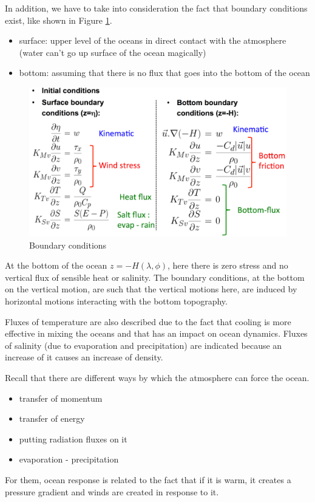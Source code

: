 In addition, we have to take into consideration the fact that boundary conditions exist, like shown in Figure \ref{fig:boundary conditions}.
\begin{itemize}
	\item surface: upper level of the oceans in direct contact with the atmosphere (water can't go up surface of the ocean magically)
	\item bottom: assuming that there is no flux that goes into the bottom of the ocean
\end{itemize}


\begin{figure}[h!]


	\centering
	\includegraphics[width=0.5\linewidth]{uploads/Screenshot 2024-11-21 225410.png}
	\caption{Boundary conditions}
	\label{fig:boundary conditions}
\end{figure}
At the bottom of the ocean $z=-H(\lambda,\phi)$, here there is zero stress and no vertical flux of sensible heat or salinity. The boundary conditions, at the bottom on the vertical motion, are such that the vertical motions here, are induced by horizontal motions interacting with the bottom topography.

Fluxes of temperature are also described due to the fact that cooling is more effective in mixing the oceans and that has an impact on ocean dynamics. Fluxes of salinity (due to evaporation and precipitation) are indicated because an increase of it causes an increase of density.

Recall that there are different ways by which the atmosphere can force the ocean.

\begin{itemize}
	\item transfer of momentum
	\item transfer of energy
	\item putting radiation fluxes on it
	\item evaporation - precipitation
\end{itemize}
For them, ocean response is related to the fact that if it is warm, it creates a pressure gradient and winds are created in response to it. \\




